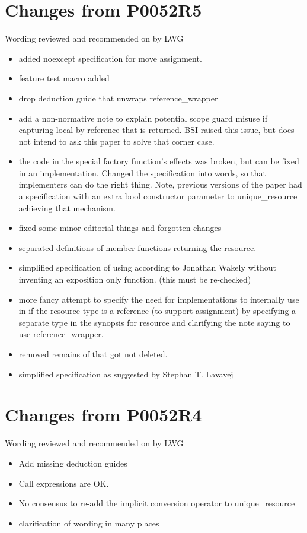 \documentclass[ebook,11pt,article]{memoir}
\begin{document}
\section{Changes from P0052R5}
Wording reviewed and recommended on by LWG
\begin{itemize}
\item added noexcept specification for move assignment.
\item feature test macro added 
\item drop  deduction guide that unwraps reference_wrapper
\item add a non-normative note to explain potential scope guard misuse if capturing local by reference that is returned. BSI raised this issue, but does not intend to ask this paper to solve that corner case.
\item the code in the special factory function's effects was broken, but can be fixed in an implementation. Changed the specification into words, so that implementers can do the right thing. Note, previous versions of the paper had a specification with an extra bool constructor parameter to unique_resource achieving that mechanism.
\item fixed some minor editorial things and forgotten changes
\item separated definitions of  member functions returning the resource.
\item simplified specification of  using  according to Jonathan Wakely without inventing an exposition only function. (this must be re-checked)
\item more fancy attempt to specify the need for implementations to internally use  in  if the resource type is a reference (to support assignment) by specifying a separate type in the  synopsis for resource and clarifying the note saying to use reference_wrapper.
\item removed remains of  that got not deleted.
\item simplified  specification as suggested by Stephan T. Lavavej
\end{itemize}

\section{Changes from P0052R4}
Wording reviewed and recommended on by LWG
\begin{itemize}
\item Add missing deduction guides
\item Call expressions are OK.
\item No consensus to re-add the implicit conversion operator to unique_resource
\item clarification of wording in many places
\end{itemize}
\end{document}
